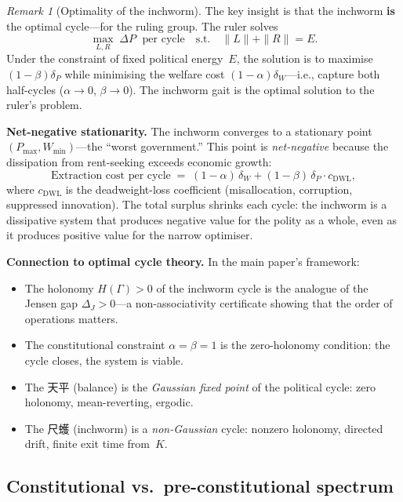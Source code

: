 \documentclass[11pt,a4paper]{article}
\theoremstyle{definition}
\theoremstyle{remark}
\newtheorem{remark}[theorem]{Remark}
\begin{document}
\begin{remark}[Optimality of the inchworm]\label{rmk:inchworm-optimal}
The key insight is that the inchworm \textbf{is} the optimal cycle---for
the ruling group.  The ruler solves
\[
  \max_{L,R}\; \Delta P \;\text{ per cycle}
  \quad\text{s.t.}\quad \|L\| + \|R\| = E.
\]
Under the constraint of fixed political energy~$E$, the solution is to
maximise $(1-\beta)\delta_P$ while minimising the welfare cost
$(1-\alpha)\delta_W$---i.e., capture both half-cycles
($\alpha \to 0$, $\beta \to 0$).
The inchworm gait is the optimal solution to the ruler's problem.

\medskip\noindent\textbf{Net-negative stationarity.}
The inchworm converges to a stationary point
$(P_{\max}, W_{\min})$---the ``worst government.''
This point is \emph{net-negative} because the dissipation from
rent-seeking exceeds economic growth:
\[
  \text{Extraction cost per cycle}
  \;=\; (1-\alpha)\,\delta_W
        + (1-\beta)\,\delta_P \cdot c_{\mathrm{DWL}},
\]
where $c_{\mathrm{DWL}}$ is the deadweight-loss coefficient
(misallocation, corruption, suppressed innovation).
The total surplus shrinks each cycle: the inchworm is a dissipative
system that produces negative value for the polity as a whole, even as
it produces positive value for the narrow optimiser.

\medskip\noindent\textbf{Connection to optimal cycle theory.}
In the main paper's framework:
\begin{itemize}[nosep]
\item The holonomy $H(\Gamma) > 0$ of the inchworm cycle is the
  analogue of the Jensen gap $\Delta_J > 0$---a non-associativity
  certificate showing that the order of operations matters.
\item The constitutional constraint $\alpha = \beta = 1$ is the
  zero-holonomy condition: the cycle closes, the system is viable.
\item The 天平 (balance) is the \emph{Gaussian fixed point} of the
  political cycle: zero holonomy, mean-reverting, ergodic.
\item The 尺蠖 (inchworm) is a \emph{non-Gaussian} cycle: nonzero
  holonomy, directed drift, finite exit time from~$K$.
\end{itemize}
\end{remark}

\subsection*{Constitutional vs.\ pre-constitutional spectrum}
\end{document}
